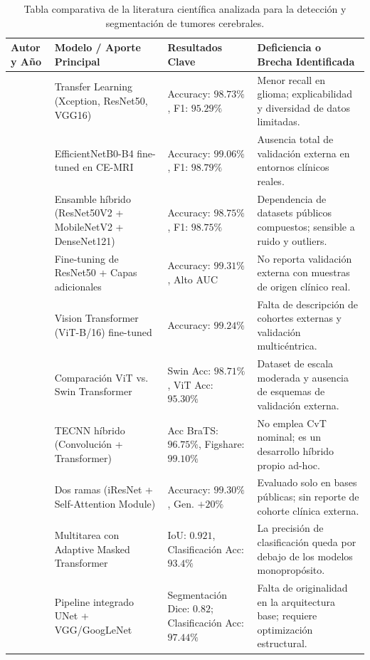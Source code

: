 \begin{table}[t]
  \caption{Tabla comparativa de la literatura científica analizada para la detección y segmentación de tumores cerebrales.}
  \label{tab:related_work_summary}
  \centering
  \small
  \setlength{\tabcolsep}{4pt}
  \renewcommand{\arraystretch}{0.9}
  \begin{tabular}{>{\raggedright\arraybackslash}p{} >{\raggedright\arraybackslash}p{} >{\raggedright\arraybackslash}p{} >{\raggedright\arraybackslash}p{}}
    \hline
    Autor y Año & Modelo / Aporte Principal & Resultados Clave & Deficiencia o Brecha Identificada \\
    \hline
    \cite{Disci2025} & Transfer Learning (Xception, ResNet50, VGG16) & Accuracy: $98.73\%$, F1: $95.29\%$ & Menor recall en glioma; explicabilidad y diversidad de datos limitadas. \\
    \cite{BabuVimala2023} & EfficientNetB0-B4 fine-tuned en CE-MRI & Accuracy: $99.06\%$, F1: $98.79\%$ & Ausencia total de validación externa en entornos clínicos reales. \\
    \cite{DwiPrayogo2025} & Ensamble híbrido (ResNet50V2 + MobileNetV2 + DenseNet121) & Accuracy: $98.75\%$, F1: $98.75\%$ & Dependencia de datasets públicos compuestos; sensible a ruido y outliers. \\
    \cite{Mitra2025} & Fine-tuning de ResNet50 + Capas adicionales & Accuracy: $99.31\%$, Alto AUC & No reporta validación externa con muestras de origen clínico real. \\
    \cite{Panigrahi2025} & Vision Transformer (ViT-B/16) fine-tuned & Accuracy: $99.24\%$ & Falta de descripción de cohortes externas y validación multicéntrica. \\
    \cite{Jain2025} & Comparación ViT vs. Swin Transformer & Swin Acc: $98.71\%$, ViT Acc: $95.30\%$ & Dataset de escala moderada y ausencia de esquemas de validación externa. \\
    \cite{Aloraini2023} & TECNN híbrido (Convolución + Transformer) & Acc BraTS: $96.75\%$, Figshare: $99.10\%$ & No emplea CvT nominal; es un desarrollo híbrido propio ad-hoc. \\
    \cite{Tabatabaei2023} & Dos ramas (iResNet + Self-Attention Module) & Accuracy: $99.30\%$, Gen. $+20\%$ & Evaluado solo en bases públicas; sin reporte de cohorte clínica externa. \\
    \cite{Lv2025} & Multitarea con Adaptive Masked Transformer & IoU: $0.921$, Clasificación Acc: $93.4\%$ & La precisión de clasificación queda por debajo de los modelos monopropósito. \\
    \cite{Dang2022} & Pipeline integrado UNet + VGG/GoogLeNet & Segmentación Dice: $0.82$; Clasificación Acc: $97.44\%$ & Falta de originalidad en la arquitectura base; requiere optimización estructural. \\
    \hline
  \end{tabular}
\end{table}
